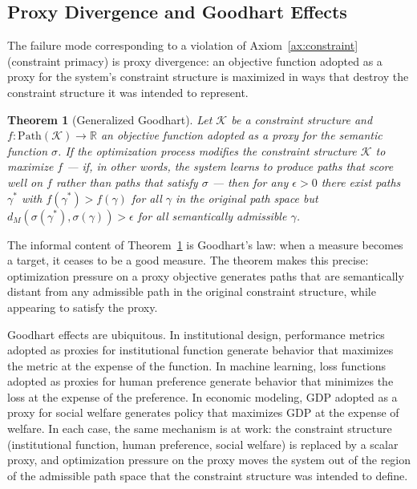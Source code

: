 \documentclass[12pt, twoside]{article}
\theoremstyle{plain}
\newtheorem{theorem}{Theorem}[section]
\theoremstyle{definition}
\theoremstyle{remark}
\newcommand{\R}{\mathbb{R}}
\begin{document}
\subsection{Proxy Divergence and Goodhart Effects}

The failure mode corresponding to a violation of
Axiom~\ref{ax:constraint} (constraint primacy) is proxy divergence:
an objective function adopted as a proxy for the system's constraint
structure is maximized in ways that destroy the constraint structure
it was intended to represent.

\begin{theorem}[Generalized Goodhart]
\label{thm:goodhart}
Let $\mathcal{K}$ be a constraint structure and $f: \mathrm{Path}(\mathcal{K}) \to \R$
an objective function adopted as a proxy for the semantic function $\sigma$.
If the optimization process modifies the constraint structure
$\mathcal{K}$ to maximize $f$ — if, in other words, the system
learns to produce paths that score well on $f$ rather than
paths that satisfy $\sigma$ — then for any $\epsilon > 0$
there exist paths $\gamma^*$ with $f(\gamma^*) > f(\gamma)$
for all $\gamma$ in the original path space but
$d_M(\sigma(\gamma^*), \sigma(\gamma)) > \epsilon$
for all semantically admissible $\gamma$.
\end{theorem}

The informal content of Theorem~\ref{thm:goodhart} is
Goodhart's law: when a measure becomes a target,
it ceases to be a good measure.
The theorem makes this precise: optimization pressure on a proxy
objective generates paths that are semantically distant from
any admissible path in the original constraint structure,
while appearing to satisfy the proxy.

Goodhart effects are ubiquitous.
In institutional design, performance metrics adopted as proxies
for institutional function generate behavior that maximizes
the metric at the expense of the function.
In machine learning, loss functions adopted as proxies for
human preference generate behavior that minimizes the loss
at the expense of the preference.
In economic modeling, GDP adopted as a proxy for social welfare
generates policy that maximizes GDP at the expense of welfare.
In each case, the same mechanism is at work:
the constraint structure (institutional function, human preference,
social welfare) is replaced by a scalar proxy,
and optimization pressure on the proxy moves the system out of
the region of the admissible path space that the constraint
structure was intended to define.
\end{document}
